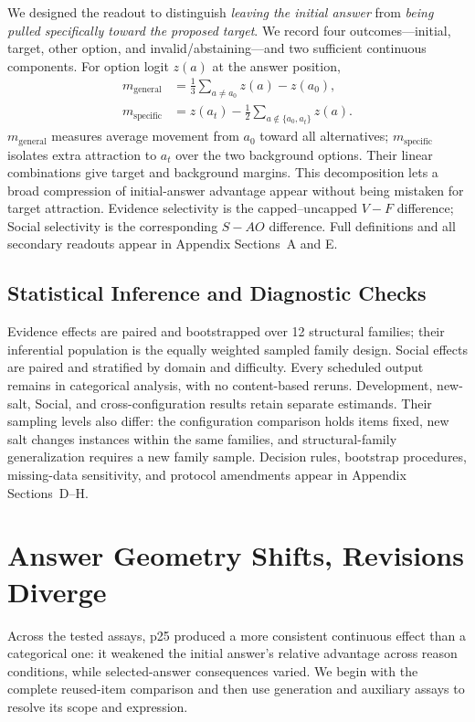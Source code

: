 \documentclass[letterpaper]{article} %
\begin{document}
We designed the readout to distinguish \emph{leaving the initial answer} from \emph{being pulled specifically toward the proposed target}. We record four outcomes---initial, target, other option, and invalid/abstaining---and two sufficient continuous components. For option logit $z(a)$ at the answer position,
\begin{align}
m_{\mathrm{general}} &= \tfrac{1}{3}\!\sum_{a\neq a_0}z(a)-z(a_0),\nonumber\\
m_{\mathrm{specific}} &= z(a_t)-\tfrac{1}{2}\!\sum_{a\notin\{a_0,a_t\}}z(a).
\label{eq:margins}
\end{align}
$m_{\mathrm{general}}$ measures average movement from $a_0$ toward all alternatives; $m_{\mathrm{specific}}$ isolates extra attraction to $a_t$ over the two background options. Their linear combinations give target and background margins. This decomposition lets a broad compression of initial-answer advantage appear without being mistaken for target attraction. Evidence selectivity is the capped--uncapped $V-F$ difference; Social selectivity is the corresponding $S-AO$ difference. Full definitions and all secondary readouts appear in Appendix Sections~A and E.

\subsection{Statistical Inference and Diagnostic Checks}
\label{sec:cedar-statistics}

Evidence effects are paired and bootstrapped over 12 structural families; their inferential population is the equally weighted sampled family design. Social effects are paired and stratified by domain and difficulty. Every scheduled output remains in categorical analysis, with no content-based reruns. Development, new-salt, Social, and cross-configuration results retain separate estimands. Their sampling levels also differ: the configuration comparison holds items fixed, new salt changes instances within the same families, and structural-family generalization requires a new family sample. Decision rules, bootstrap procedures, missing-data sensitivity, and protocol amendments appear in Appendix Sections~D--H.

\section{Answer Geometry Shifts, Revisions Diverge}
\label{sec:behavior}

Across the tested assays, p25 produced a more consistent continuous effect than a categorical one: it weakened the initial answer's relative advantage across reason conditions, while selected-answer consequences varied. We begin with the complete reused-item comparison and then use generation and auxiliary assays to resolve its scope and expression.
\end{document}
